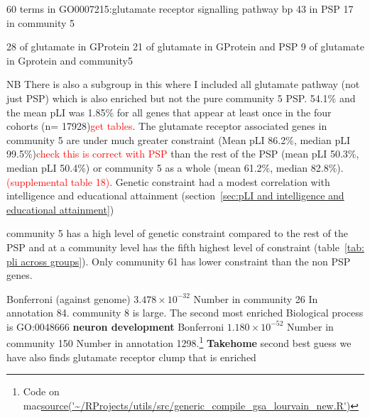 60 terms in GO0007215:glutamate receptor signalling pathway bp
43 in PSP
17 in community 5 

28 of glutamate in GProtein
21 of glutamate in GProtein and PSP
9 of glutamate in Gprotein and community5




NB There is also a subgroup in this where I included all glutamate pathway (not just PSP) which is also enriched but not the pure community 5 PSP.
54.1\% and the mean pLI was 1.85\% for all genes that appear at least once in the four cohorts (n= 17928)\textcolor{red}{get tables}. The glutamate receptor associated genes in community 5 are under much greater constraint (Mean pLI 86.2\%, median pLI 99.5\%)\textcolor{red}{check this is correct with PSP} than the rest of the PSP (mean pLI 50.3\%, median pLI 50.4\%) or community 5 as a whole (mean 61.2\%, median 82.8\%).
\textcolor{red}{(supplemental table 18)}. Genetic constraint had a modest correlation with intelligence and educational attainment (section~\ref{sec:pLI and intelligence and educational attainment})


community 5 has a high level of genetic constraint compared to the rest of the PSP and at a community level has the fifth highest level of constraint (table~\ref{tab: pli across groups}). Only community 61 has lower constraint than the non PSP genes. 





Bonferroni (against genome) $3.478 \times 10^{-32}$ 	Number in community 26  In annotation	84. 
community 8 is large. The second most enriched Biological process is GO:0048666 \textbf{	neuron development} 		Bonferroni	$1.180 \times 10^{-52}$ 	Number in community 150 	Number in annotation 1298.\footnote{Code on mac\url{source('~/RProjects/utils/src/generic_compile_gsa_lourvain_new.R')}}
\textbf{Takehome} second best guess we have also finds glutamate receptor clump that is enriched

